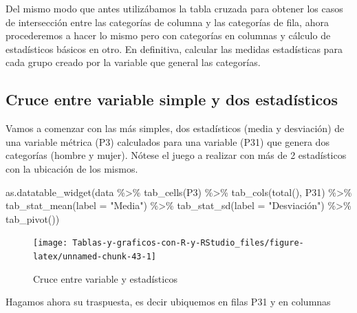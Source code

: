 \documentclass[
]{book}
\newenvironment{Shaded}{\begin{snugshade}}{\end{snugshade}}
\newcommand{\AttributeTok}[1]{\textcolor[rgb]{0.77,0.63,0.00}{#1}}
\newcommand{\FunctionTok}[1]{\textcolor[rgb]{0.00,0.00,0.00}{#1}}
\newcommand{\NormalTok}[1]{#1}
\newcommand{\SpecialCharTok}[1]{\textcolor[rgb]{0.00,0.00,0.00}{#1}}
\newcommand{\StringTok}[1]{\textcolor[rgb]{0.31,0.60,0.02}{#1}}
\begin{document}
Del mismo modo que antes utilizábamos la tabla cruzada para obtener los casos de intersección entre las categorías de columna y las categorías de fila, ahora procederemos a hacer lo mismo pero con categorías en columnas y cálculo de estadísticos básicos en otro. En definitiva, calcular las medidas estadísticas para cada grupo creado por la variable que general las categorías.

\hypertarget{cruce-entre-variable-simple-y-dos-estaduxedsticos}{%
\subsection{Cruce entre variable simple y dos estadísticos}\label{cruce-entre-variable-simple-y-dos-estaduxedsticos}}

Vamos a comenzar con las más simples, dos estadísticos (media y desviación) de una variable métrica (P3) calculados para una variable (P31) que genera dos categorías (hombre y mujer). Nótese el juego a realizar con más de 2 estadísticos con la ubicación de los mismos.

\begin{Shaded}
\begin{Highlighting}[]
\FunctionTok{as.datatable\_widget}\NormalTok{(data }\SpecialCharTok{\%\textgreater{}\%}
  \FunctionTok{tab\_cells}\NormalTok{(P3) }\SpecialCharTok{\%\textgreater{}\%}
  \FunctionTok{tab\_cols}\NormalTok{(}\FunctionTok{total}\NormalTok{(), P31) }\SpecialCharTok{\%\textgreater{}\%}
  \FunctionTok{tab\_stat\_mean}\NormalTok{(}\AttributeTok{label =} \StringTok{"Media"}\NormalTok{) }\SpecialCharTok{\%\textgreater{}\%}
  \FunctionTok{tab\_stat\_sd}\NormalTok{(}\AttributeTok{label =} \StringTok{"Desviación"}\NormalTok{) }\SpecialCharTok{\%\textgreater{}\%}
  \FunctionTok{tab\_pivot}\NormalTok{())}
\end{Highlighting}
\end{Shaded}

\begin{figure}[H]

{\centering \texttt{[image: Tablas-y-graficos-con-R-y-RStudio\_files/figure-latex/unnamed-chunk-43-1]} 

}

\caption{Cruce entre variable y estadísticos}\label{fig:unnamed-chunk-43}
\end{figure}

Hagamos ahora su traspuesta, es decir ubiquemos en filas P31 y en columnas
\end{document}
